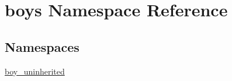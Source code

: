 \hypertarget{namespaceboys}{}\section{boys Namespace Reference}
\label{namespaceboys}
\subsection*{Namespaces}
\begin{DoxyCompactItemize}
\item 
 \hyperlink{namespaceboys_1_1boy__uninherited}{boy\+\_\+uninherited}
\end{DoxyCompactItemize}
